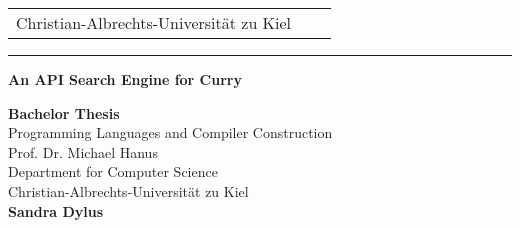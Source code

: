 \documentclass[%
	pdftex,%
	a4paper,%
	oneside,%
	chapterprefix,%
	headsepline,%
	12pt%
]{scrbook}
\begin{document}


\newcommand{\trtitle}{An API Search Engine for Curry}
\newcommand{\trtype}{Bachelor Thesis}
\newcommand{\trauthor}{Sandra Dylus}
\newcommand{\trstrasse}{Gutenbergstra\ss e 3}
\newcommand{\trmatrikelnummer}{1083}
\newcommand{\trort}{24116 Kiel}
\newcommand{\trbetreuer}{M.o.Sc. Bj\"orn Peem\"oller}
\newcommand{\trprof}{Prof. Dr. Michael Hanus}
\newcommand{\trfachgebiet}{Programming Languages and Compiler Construction}
\newcommand{\trinstitut}{Computer Science}
\newcommand{\trfakultaet}{Technische Fakult\"at}
\newcommand{\truni}{Christian-Albrechts-Universit\"at zu Kiel}
\newcommand{\trdate}{\today}

\thispagestyle{empty}

\begin{tabular}{lcr}
\truni 
  \\
\end{tabular}

\rule{\textwidth}{0.4pt}

\vspace{2.5cm}
\begin{center}
  \textbf{\LARGE \trtitle}
\end{center}
\vspace{2cm}

\begin{center}
  \textbf{\trtype} \\
  \trfachgebiet \\
  \trprof \\
  Department for \trinstitut \\
  \truni \\[0.5cm]
  \textbf{\trauthor}
\end{center}
\end{document}
